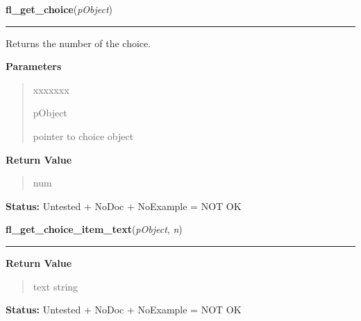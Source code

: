 \hspace{.8\funcindent}\begin{boxedminipage}{\funcwidth}

    \raggedright \textbf{fl\_get\_choice}(\textit{pObject})

    \vspace{-1.5ex}

    \rule{\textwidth}{0.5\fboxrule}
\setlength{\parskip}{2ex}
    Returns the number of the choice.

\setlength{\parskip}{1ex}
      \textbf{Parameters}
      \vspace{-1ex}

      \begin{quote}
        \begin{Ventry}{xxxxxxx}

          \item[pObject]

          pointer to choice object

        \end{Ventry}

      \end{quote}

      \textbf{Return Value}
    \vspace{-1ex}

      \begin{quote}
      num

      \end{quote}

\textbf{Status:} Untested + NoDoc + NoExample = NOT OK



    \end{boxedminipage}

    \label{xformslib:library:fl_get_choice_item_text}

    \vspace{0.5ex}

\hspace{.8\funcindent}\begin{boxedminipage}{\funcwidth}

    \raggedright \textbf{fl\_get\_choice\_item\_text}(\textit{pObject}, \textit{n})

    \vspace{-1.5ex}

    \rule{\textwidth}{0.5\fboxrule}
\setlength{\parskip}{2ex}
\setlength{\parskip}{1ex}
      \textbf{Return Value}
    \vspace{-1ex}

      \begin{quote}
      text string

      \end{quote}

\textbf{Status:} Untested + NoDoc + NoExample = NOT OK



    \end{boxedminipage}

